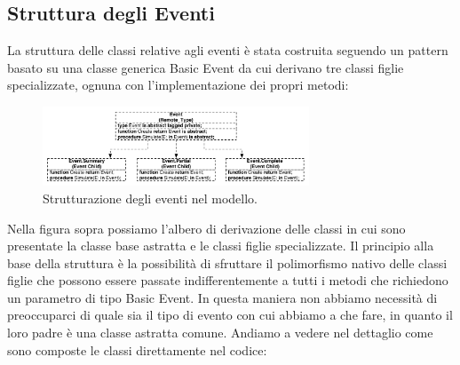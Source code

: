 \documentclass[aps,letterpaper,10pt]{article}
\begin{document}
\subsection{Struttura degli Eventi}

La struttura delle classi relative agli eventi \`e stata costruita seguendo un pattern basato su una classe generica Basic Event da cui derivano tre classi figlie specializzate, ognuna con l'implementazione dei propri metodi:

\begin{figure}[H]
	\begin{center}
		\includegraphics[width=300px]{images/event-struct.pdf}
	\end{center}
\caption{Strutturazione degli eventi nel modello.}
\end{figure}

Nella figura sopra possiamo l'albero di derivazione delle classi in cui sono presentate la classe base astratta e le classi figlie specializzate. Il principio alla base della struttura \`e la possibilit\`a di sfruttare il polimorfismo nativo delle classi figlie che possono essere passate indifferentemente a tutti i metodi che richiedono un parametro di tipo Basic Event. In questa maniera non abbiamo necessit\`a di preoccuparci di quale sia il tipo di evento con cui abbiamo a che fare, in quanto il loro padre \`e una classe astratta comune. Andiamo a vedere nel dettaglio come sono composte le classi direttamente nel codice:
\end{document}

